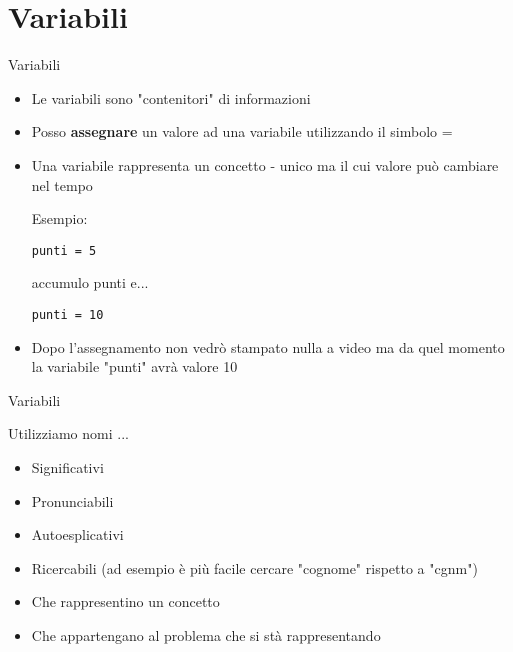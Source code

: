 \section{Variabili}

\begin{frame}{}
	\begin{block}{Variabili}
        \begin{itemize}
            \item Le variabili sono "contenitori" di informazioni
            \item Posso \textbf{assegnare} un valore ad una variabile utilizzando il simbolo =
            \item Una variabile rappresenta un concetto - unico ma il cui valore può cambiare nel tempo
            
            Esempio:
                    
                    \lstinline{punti = 5}
            
                    accumulo punti e...
            
                    \lstinline{punti = 10}
            \item Dopo l'assegnamento non vedrò stampato nulla a video ma da quel momento la variabile "punti" avrà valore 10        
        \end{itemize}
	\end{block}

\end{frame}

\begin{frame}{Variabili}
    \begin{block}{Utilizziamo nomi ...}
        \begin{itemize}
            \item Significativi
            \item Pronunciabili
            \item Autoesplicativi
            \item Ricercabili (ad esempio è più facile cercare "cognome" rispetto a "cgnm")
            \item Che rappresentino un concetto
            \item Che appartengano al problema che si stà rappresentando
        \end{itemize}
    \end{block}
\end{frame}


